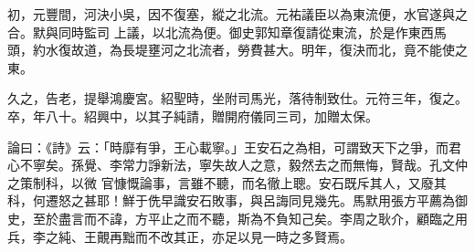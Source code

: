 \begin{pinyinscope}
 初，元豐間，河決小吳，因不復塞，縱之北流。元祐議臣以為東流便，水官遂與之合。默與同時監司
 上議，以北流為便。御史郭知章復請從東流，於是作東西馬頭，約水復故道，為長堤壅河之北流者，勞費甚大。明年，復決而北，竟不能使之東。



 久之，告老，提舉鴻慶宮。紹聖時，坐附司馬光，落待制致仕。元符三年，復之。卒，年八十。紹興中，以其子純請，贈開府儀同三司，加贈太保。



 論曰：《詩》云：「時靡有爭，王心載寧。」王安石之為相，可謂致天下之爭，而君心不寧矣。孫覺、李常力諍新法，寧失故人之意，毅然去之而無悔，賢哉。孔文仲之策制科，以微
 官慷慨論事，言雖不聽，而名徹上聰。安石既斥其人，又廢其科，何遷怒之甚耶！鮮于侁早識安石敗事，與呂誨同見幾先。馬默用張方平薦為御史，至於盡言而不諱，方平止之而不聽，斯為不負知己矣。李周之耿介，顧臨之用兵，李之純、王覿再黜而不改其正，亦足以見一時之多賢焉。



\end{pinyinscope}